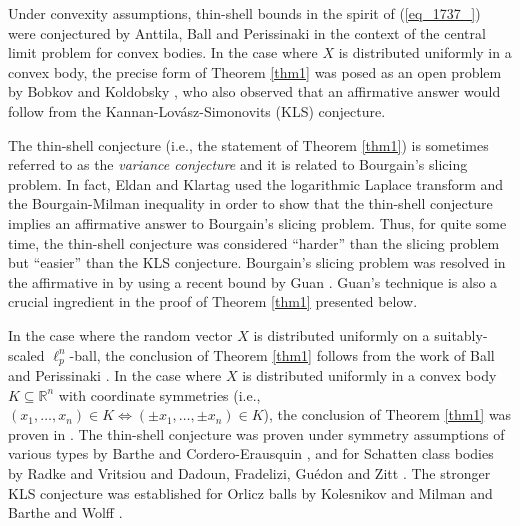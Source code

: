 \documentclass[12pt,a4paper]{article}
\newcommand{\RR}{\mathbb{R}}
\theoremstyle{definition}
\begin{document}
\medskip Under convexity assumptions, thin-shell bounds in the spirit of  (\ref{eq_1737_}) were  conjectured
by Anttila, Ball and Perissinaki \cite{ABP} in the context of the central limit problem for convex bodies.
In the case where $X$ is distributed uniformly in a convex body,
the precise form of Theorem \ref{thm1}  was posed as an open problem by Bobkov and Koldobsky \cite{BobKol},
who also observed that an affirmative answer would follow from the Kannan-Lov\'asz-Simonovits (KLS) conjecture.

\medskip The thin-shell conjecture (i.e., the statement of Theorem \ref{thm1}) is sometimes referred to as the {\it variance conjecture}
and it is related  to Bourgain's slicing problem.
In fact, Eldan and Klartag \cite{EK} used the logarithmic Laplace transform and the Bourgain-Milman inequality \cite{bourgain_milman}
in order to show that the thin-shell conjecture implies an affirmative
answer to Bourgain's slicing problem. Thus, for quite some time, the thin-shell conjecture was considered ``harder'' than the slicing
problem but ``easier'' than the KLS conjecture. Bourgain's slicing problem was resolved in the affirmative in \cite{KL_slicing}
by using a recent bound by Guan \cite{guan}. Guan's technique is also a crucial ingredient in the proof of Theorem \ref{thm1} presented below.

\medskip In the case where the random vector $X$ is distributed uniformly on a suitably-scaled $\ell_p^n$-ball, the conclusion of
Theorem \ref{thm1} follows from the work of Ball and Perissinaki \cite{ball_perissinaki}. In the case
where $X$ is distributed uniformly in a convex body $K \subseteq \RR^n$ with coordinate symmetries
(i.e., $(x_1,\ldots,x_n) \in K \iff (\pm x_1,\ldots,\pm x_n) \in K$), the conclusion of Theorem \ref{thm1}
was proven in \cite{K_ptrf}. The thin-shell conjecture was proven under symmetry assumptions of various types by Barthe and Cordero-Erausquin \cite{BCE},
and for Schatten class bodies by Radke and Vritsiou \cite{RV} and 
Dadoun, Fradelizi, Gu\'edon and Zitt \cite{DFGZ}. The stronger KLS conjecture was established for Orlicz balls by Kolesnikov and Milman 
\cite{KolesMil} and  Barthe and Wolff \cite{BW}. 
\end{document}
